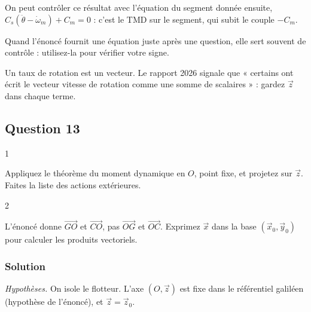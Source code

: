 \documentclass[11pt,a4paper]{article}
\newcommand{\equationajustee}[1]{%
  \sbox{\boiteequation}{$\displaystyle #1$}%
  \ifdim\wd\boiteequation>\linewidth
    \[\resizebox{\linewidth}{!}{\usebox{\boiteequation}}\]%
  \else
    \[#1\]%
  \fi}
\begin{document}
\equationajustee{\vec\Omega_{s/0}=\vec\Omega_{s/f}+\vec\Omega_{f/0}=\boxed{(\dot\theta-\omega_m)\,\vec z}}

On peut contrôler ce résultat avec l'équation du segment donnée ensuite, \(C_s(\ddot\theta-\dot\omega_m)+C_m=0\) : c'est le TMD sur le segment, qui subit le couple \(-C_m\).

\begin{methode}

Quand l'énoncé fournit une équation juste après une question, elle sert souvent de contrôle : utilisez-la pour vérifier votre signe.

\end{methode}

\begin{piege}

Un taux de rotation est un vecteur. Le rapport 2026 signale que « certains ont écrit le vecteur vitesse de rotation comme une somme de scalaires » : gardez \(\vec z\) dans chaque terme.

\end{piege}

\hypertarget{question-13}{%
\subsection{Question 13}\label{question-13}}

\begin{indication}{1}

Appliquez le théorème du moment dynamique en \(O\), point fixe, et projetez sur \(\vec z\). Faites la liste des actions extérieures.

\end{indication}

\begin{indication}{2}

L'énoncé donne \(\overrightarrow{GO}\) et \(\overrightarrow{CO}\), pas \(\overrightarrow{OG}\) et \(\overrightarrow{OC}\). Exprimez \(\vec x\) dans la base \((\vec x_0,\vec y_0)\) pour calculer les produits vectoriels.

\end{indication}

\hypertarget{solution-12}{%
\subsubsection{Solution}\label{solution-12}}

\emph{Hypothèses.} On isole le flotteur. L'axe \((O,\vec z)\) est fixe dans le référentiel galiléen (hypothèse de l'énoncé), et \(\vec z=\vec z_0\).
\end{document}
